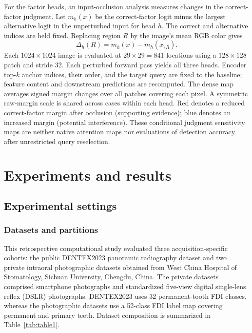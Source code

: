 \documentclass[a4paper,fleqn]{cas-dc}
\begin{document}
For the factor heads, an input-occlusion analysis \citep{zeiler2014visualizing} measures changes in the correct-factor judgment. Let $m_h(x)$ be the correct-factor logit minus the largest alternative logit in the unperturbed input for head $h$. The correct and alternative indices are held fixed. Replacing region $R$ by the image's mean RGB color gives
\begin{equation}
 \Delta_h(R)=m_h(x)-m_h(x_{\setminus R}).
 \label{eq:occlusion}
\end{equation}
Each $1024\times1024$ image is evaluated at $29\times29=841$ locations using a $128\times128$ patch and stride 32. Each perturbed forward pass yields all three heads. Encoder top-$k$ anchor indices, their order, and the target query are fixed to the baseline; feature content and downstream predictions are recomputed. The dense map averages signed margin changes over all patches covering each pixel. A symmetric raw-margin scale is shared across cases within each head. Red denotes a reduced correct-factor margin after occlusion (supporting evidence); blue denotes an increased margin (potential interference). These conditional judgment sensitivity maps are neither native attention maps nor evaluations of detection accuracy after unrestricted query reselection.

\FloatBarrier

\section{Experiments and results}
\label{sec:experiments}

\subsection{Experimental settings}
\subsubsection{Datasets and partitions}
This retrospective computational study evaluated three acquisition-specific cohorts: the public DENTEX2023 panoramic radiography dataset \citep{hamamci2023dentex} and two private intraoral photographic datasets obtained from West China Hospital of Stomatology, Sichuan University, Chengdu, China. The private datasets comprised smartphone photographs and standardized five-view digital single-lens reflex (DSLR) photographs. DENTEX2023 uses 32 permanent-tooth FDI classes, whereas the photographic datasets use a 52-class FDI label map covering permanent and primary teeth. Dataset composition is summarized in Table~\ref{tab:table1}.
\end{document}
